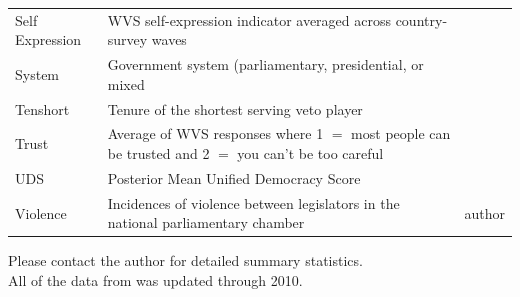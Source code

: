 \documentclass[a4paper]{article}\usepackage[]{graphicx}\usepackage[]{color}
\begin{document}
\begin{table}[!h]
\begin{center}
\begin{tabular}{l m{7cm} m{3.5cm}}
            Self Expression & WVS self-expression indicator averaged across country-survey waves & \cite{WVS2009} \\
            System & Government system (parliamentary, presidential, or mixed & \cite{DPI2001} \\
            Tenshort & Tenure of the shortest serving veto player & \cite{DPI2001} \\
            Trust & Average of WVS responses where 1 $=$ most people can be trusted and 2 $=$ you can't be too careful & \cite{WVS2009} \\
            UDS & Posterior Mean Unified Democracy Score & \cite{Pemstein2010} \\
            Violence & Incidences of violence between legislators in the national parliamentary chamber & author \\
            \hline

    \end{tabular}
    \end{center}
    \begin{singlespace}
        Please contact the author for detailed summary statistics. \\
        All of the data from \cite{DPI2001} was updated through 2010.
    \end{singlespace}
\end{table}  
\end{document}

